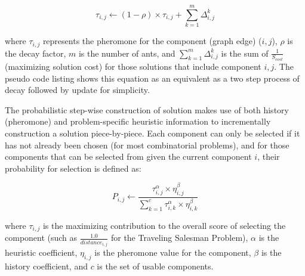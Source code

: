 \begin{equation}
\tau_{i,j} \leftarrow (1-\rho) \times \tau_{i,j} + \sum_{k=1}^m \Delta_{i,j}^k
\end{equation}

where $\tau_{i,j}$ represents the pheromone for the component (graph edge) ($i,j$), $\rho$ is the decay factor, $m$ is the number of ants, and  $\sum_{k=1}^m \Delta_{i,j}^k $ is the sum of $\frac{1}{S_{cost}} $ (maximizing solution cost) for those solutions that include component $i,j$. The pseudo code listing shows this equation as an equivalent as a two step process of decay followed by update for simplicity. 

The probabilistic step-wise construction of solution makes use of both history (pheromone) and problem-specific heuristic information to incrementally construction a solution piece-by-piece. Each component can only be selected if it has not already been chosen (for most combinatorial problems), and for those components that can  be selected from given the current component $i$, their probability for selection is defined as:

\begin{equation}
P_{i,j} \leftarrow \frac{\tau_{i,j}^{\alpha} \times \eta_{i,j}^{\beta}}{\sum_{k=1}^c \tau_{i,k}^{\alpha} \times \eta_{i,k}^{\beta}}
\end{equation}

where $\tau_{i,j}$ is the maximizing contribution to the overall score of selecting the component (such as $\frac{1.0}{distance_{i,j}}$ for the Traveling Salesman Problem), $\alpha$ is the heuristic coefficient, $\eta_{i,j}$ is the pheromone value for the component, $\beta$ is the history coefficient, and $c$ is the set of usable components. 

